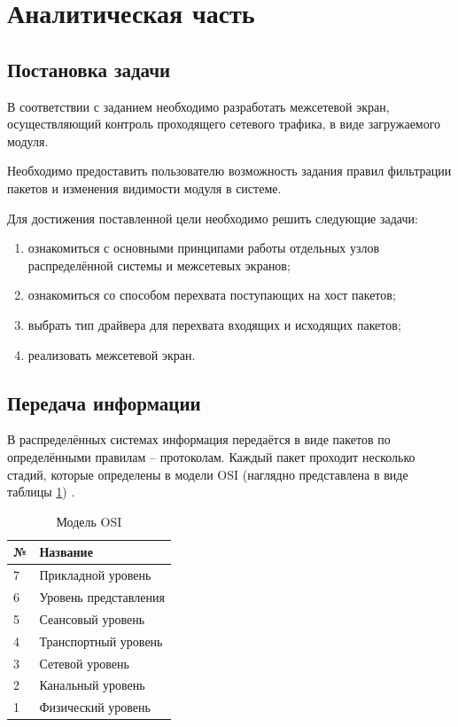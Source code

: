 \section{Аналитическая часть}

\subsection{Постановка задачи}\label{sec:task}
В соответствии с заданием необходимо разработать межсетевой экран, осуществляющий контроль проходящего сетевого трафика, в виде загружаемого модуля.

Необходимо предоставить пользователю возможность задания правил фильтрации пакетов и изменения видимости модуля в системе.

Для достижения поставленной цели необходимо решить следующие задачи:
\begin{enumerate}
	\item ознакомиться с основными принципами работы отдельных узлов распределённой системы и межсетевых экранов;
	
	\item ознакомиться со способом перехвата поступающих на хост пакетов;
	
	\item выбрать тип драйвера для перехвата входящих и исходящих пакетов;
	
	\item реализовать межсетевой экран. \newline
\end{enumerate}

\subsection{Передача информации}
В распределённых системах информация передаётся в виде пакетов по определёнными правилам -- протоколам. Каждый пакет проходит несколько стадий, которые определены в модели OSI (наглядно представлена в виде таблицы \ref{osi_table}) \cite{net}.

\begin{table}[h]
	\begin{center}
		\caption{Модель OSI}
		\label{osi_table}
		\begin{tabular}{| p{1cm} | p{7cm} |}
			\hline
			\textbf{№} 	& \textbf{Название} \\
			\hline
			7 				& Прикладной уровень\\ 
			\hline
			6 				& Уровень представления  \\ 
			\hline
			5 		& Сеансовый уровень \\ 
			\hline
			4 		& Транспортный уровень \\ 
			\hline
			3 		& Сетевой уровень \\ 
			\hline
			2 		& Канальный уровень \\ 
			\hline
			1 		& Физический уровень \\ 
			\hline
		\end{tabular}
	\end{center}
\end{table} 

